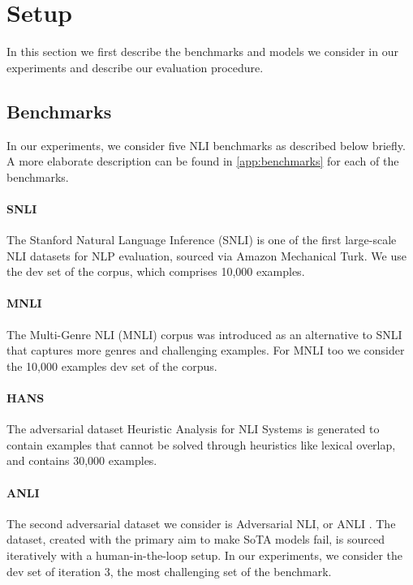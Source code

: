\section{Setup}

In this section we first describe the benchmarks and models we consider in our experiments and describe our evaluation procedure.

\subsection{Benchmarks}
In our experiments, we consider five NLI benchmarks as described below briefly. A more elaborate description can be found in \cref{app:benchmarks} for each of the benchmarks.

\vspace{-1mm}
\paragraph{SNLI}
The Stanford Natural Language Inference (SNLI) is one of the first large-scale NLI datasets for NLP evaluation, sourced via Amazon Mechanical Turk.
We use the dev set of the corpus, which comprises 10,000 examples.

\vspace{-1mm}
\paragraph{MNLI}
The Multi-Genre NLI (MNLI) corpus \citep{williams-etal-2018-broad} was introduced as an alternative to SNLI that captures more genres and challenging examples. For MNLI too we consider the 10,000 examples dev set of the corpus.

\vspace{-1mm}
\paragraph{HANS}
The adversarial dataset Heuristic Analysis for NLI Systems \citep[HANS,][]{mccoy-etal-2019-right} is generated to contain examples that cannot be solved through heuristics like lexical overlap, and contains 30,000 examples.

\vspace{-1mm}
\paragraph{ANLI}
The second adversarial dataset we consider is Adversarial NLI, or ANLI \citep{nie-etal-2020-adversarial}.
The dataset, created with the primary aim to make SoTA models fail, is sourced iteratively with a human-in-the-loop setup.
In our experiments, we consider the dev set of iteration 3, the most challenging set of the benchmark.


